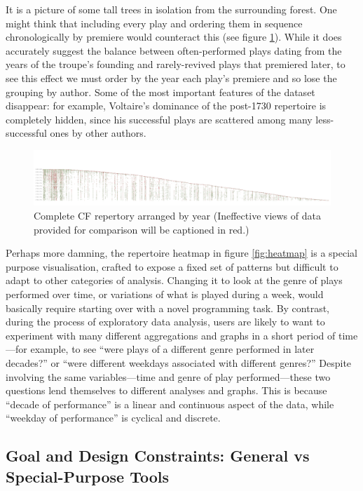 \documentclass[	DIV=calc,%
							paper=a4,%
							fontsize=11pt,%
							twocolumn]{scrartcl}	 					%
\begin{document}
It is a picture of some tall trees in isolation from the surrounding forest.  One might think that including every play and ordering them in sequence chronologically by premiere would counteract this (see figure \ref{fig:heatmap_all}).  While it does accurately suggest the balance between often-performed plays dating from the years of the troupe’s founding and rarely-revived plays that premiered later, to see this effect we must order by the year each play’s premiere and so lose the grouping by author.  Some of the most important features of the dataset disappear: for example, Voltaire’s dominance of the post-1730 repertoire is completely hidden, since his successful plays are scattered among many less-successful ones by other authors.

\begin{figure}
  \centering
	\includegraphics[width=9in,angle=270]{viz/repertoire_by_season_all.pdf}
	\caption{\color{red}Complete CF repertory arranged by year
	         \newline
					 \color{black}(Ineffective views of data provided for comparison will be captioned in red.)}
  \label{fig:heatmap_all}
\end{figure}

Perhaps more damning, the repertoire heatmap in figure \ref{fig:heatmap} is a special purpose visualisation, crafted to expose a fixed set of patterns but difficult to adapt to other categories of analysis.  Changing it to look at the genre of plays performed over time, or variations of what is played during a week, would basically require starting over with a novel programming task.  By contrast, during the process of exploratory data analysis, users are likely to want to experiment with many different aggregations and graphs in a short period of time—for example, to see ``were plays of a different genre performed in later decades?'' or ``were different weekdays associated with different genres?''  Despite involving the same variables—time and genre of play performed—these two questions lend themselves to different analyses and graphs.  This is because ``decade of performance'' is a linear and continuous aspect of the data, while ``weekday of performance'' is cyclical and discrete.

\subsection*{Goal and Design Constraints: General vs Special-Purpose Tools}
\end{document}
